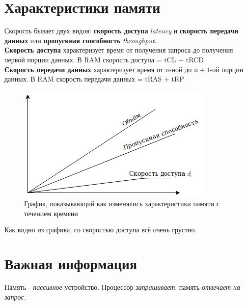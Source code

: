\documentclass[12pt, a4paper]{article}
\begin{document}
\section{Характеристики памяти}
Скорость бывает двух видов: \textbf{скорость доступа} \textit{latency} и \textbf{скорость передачи данных} или \textbf{пропускная способность} \textit{throughput}.\\
\textbf{Скорость доступа} характеризует время от получения запроса до получения первой порции данных. В RAM скорость доступа = tCL + tRCD\\
\textbf{Скорость передачи данных} характеризует время от $n$-ной до $n+1$-ой порции данных. В RAM скорость передачи данных = tRAS + tRP\\
\begin{figure}[h]
    \centering
    \includegraphics[scale=0.4]{./images/graphic.png}
    \caption{График, показывающий как изменялись характеристики памяти с течением времени}
    \label{fig:SDR_SDRAM}
\end{figure}
Как видно из графика, со скоростью доступа всё очень грустно.
\section{Важная информация}
Память - \textit{пассивное} устройство. Процессор \textit{запрашивает}, память \textit{отвечает на запрос}.
\end{document}
